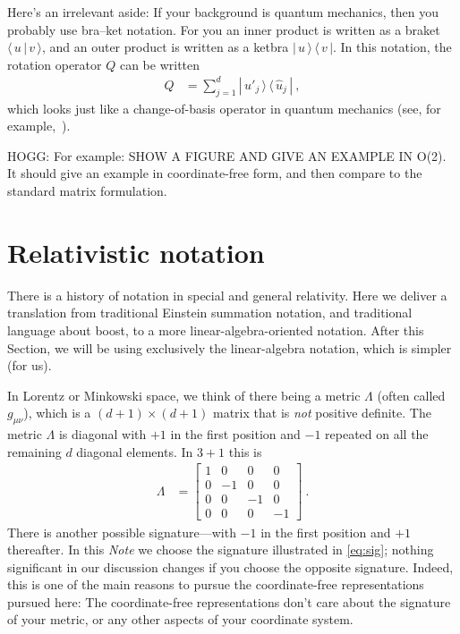 \documentclass{article}
\newcommand{\braket}[2]{\langle\,{#1}\,|\,{#2}\,\rangle}
\newcommand{\ketbra}[2]{|\,{#1}\,\rangle\,\langle\,{#2}\,|}
\newcommand{\documentname}{\textsl{Note}}
\begin{document}
Here's an irrelevant aside:
If your background is quantum mechanics, then you probably use bra--ket notation.
For you an inner product is written as a braket $\braket{u}{v}$, and an outer product is written as a ketbra $\ketbra{u}{v}$.
In this notation, the rotation operator $Q$ can be written 
\begin{align}
    Q &= \sum_{j=1}^d \ketbra{\hat{u}'_j}{\hat{u}_j} ~,
\end{align}
which looks just like a change-of-basis operator in quantum mechanics (see, for example,~\cite{}).

HOGG: For example: SHOW A FIGURE AND GIVE AN EXAMPLE IN O(2).
It should give an example in coordinate-free form, and then compare
to the standard matrix formulation.

\section{Relativistic notation}\label{sec:notation}

There is a history of notation in special and general relativity.
Here we deliver a translation from traditional Einstein summation notation, and traditional language about boost, to a more linear-algebra-oriented notation.
After this Section, we will be using exclusively the linear-algebra notation, which is simpler (for us).

In Lorentz or Minkowski space, we think of there being a metric $\Lambda$ (often called $g_{\mu\nu}$), which is a $(d+1)\times(d+1)$ matrix that is \emph{not} positive definite.
The metric $\Lambda$ is diagonal with $+1$ in the first position and $-1$ repeated on all the remaining $d$ diagonal elements.
In $3+1$ this is
\begin{align}\label{eq:sig}
    \Lambda &= \begin{bmatrix}1 & 0 & 0 & 0\\
                              0 & -1 & 0 & 0\\
                              0 & 0 & -1 & 0\\
                              0 & 0 & 0 & -1\end{bmatrix} ~.
\end{align}
There is another possible signature---with $-1$ in the first position and $+1$ thereafter.
In this \documentname{} we choose the signature illustrated in \eqref{eq:sig}; nothing significant in our discussion changes if you choose the opposite signature.
Indeed, this is one of the main reasons to pursue the coordinate-free representations pursued here:
The coordinate-free representations don't care about the signature of your metric, or any other aspects of your coordinate system.
\end{document}
